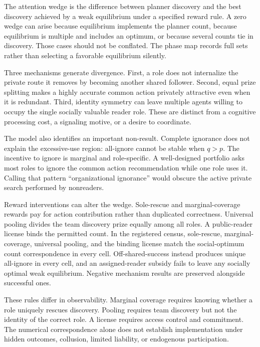 \documentclass[11pt]{article}
\begin{document}
The attention wedge is the difference between planner discovery and the best
discovery achieved by a weak equilibrium under a specified reward rule. A zero
wedge can arise because equilibrium implements the planner count, because
equilibrium is multiple and includes an optimum, or because several counts tie
in discovery. Those cases should not be conflated. The phase map records full
sets rather than selecting a favorable equilibrium silently.

Three mechanisms generate divergence. First, a role does not internalize the
private route it removes by becoming another shared follower. Second, equal
prize splitting makes a highly accurate common action privately attractive even
when it is redundant. Third, identity symmetry can leave multiple agents
willing to occupy the single socially valuable reader role. These are distinct
from a cognitive processing cost, a signaling motive, or a desire to coordinate.

The model also identifies an important non-result. Complete ignorance does not
explain the excessive-use region: all-ignore cannot be stable when $q>p$. The
incentive to ignore is marginal and role-specific. A well-designed portfolio
asks most roles to ignore the common action recommendation while one role uses
it. Calling that pattern ``organizational ignorance'' would obscure the active
private search performed by nonreaders.

Reward interventions can alter the wedge. Sole-rescue and marginal-coverage
rewards pay for action contribution rather than duplicated correctness.
Universal pooling divides the team discovery prize equally among all roles.
A public-reader license binds the permitted count. In the registered census,
sole-rescue, marginal-coverage, universal pooling, and the binding license match
the social-optimum count correspondence in every cell. Off-shared-success
instead produces unique all-ignore in every cell, and an assigned-reader subsidy
fails to leave any socially optimal weak equilibrium. Negative mechanism results
are preserved alongside successful ones.

These rules differ in observability. Marginal coverage requires knowing whether
a role uniquely rescues discovery. Pooling requires team discovery but not the
identity of the correct role. A license requires access control and commitment.
The numerical correspondence alone does not establish implementation under
hidden outcomes, collusion, limited liability, or endogenous participation.
\end{document}
